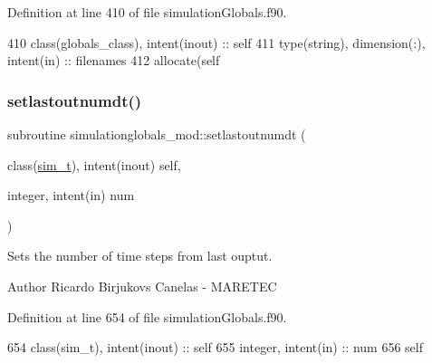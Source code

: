 Definition at line 410 of file simulation\+Globals.\+f90.


\begin{DoxyCode}
410     \textcolor{keywordtype}{class}(globals\_class), \textcolor{keywordtype}{intent(inout)} :: self
411     \textcolor{keywordtype}{type}(string), \textcolor{keywordtype}{dimension(:)}, \textcolor{keywordtype}{intent(in)} :: filenames
412     \textcolor{keyword}{allocate}(self%
\end{DoxyCode}
\mbox{\label{namespacesimulationglobals__mod_ab760ab6064743ff54237166301346616}} 
\subsubsection{\texorpdfstring{setlastoutnumdt()}{setlastoutnumdt()}}
{\footnotesize\ttfamily subroutine simulationglobals\+\_\+mod\+::setlastoutnumdt (\begin{DoxyParamCaption}\item[{class(\mbox{\hyperlink{structsimulationglobals__mod_1_1sim__t}{sim\+\_\+t}}), intent(inout)}]{self,  }\item[{integer, intent(in)}]{num }\end{DoxyParamCaption})\hspace{0.3cm}{\ttfamily [private]}}



Sets the number of time steps from last ouptut. 

\begin{DoxyAuthor}{Author}
Ricardo Birjukovs Canelas -\/ M\+A\+R\+E\+T\+EC 
\end{DoxyAuthor}


Definition at line 654 of file simulation\+Globals.\+f90.


\begin{DoxyCode}
654     \textcolor{keywordtype}{class}(sim\_t), \textcolor{keywordtype}{intent(inout)} :: self
655     \textcolor{keywordtype}{integer}, \textcolor{keywordtype}{intent(in)} :: num
656     self%
\end{DoxyCode}
\mbox{\label{namespacesimulationglobals__mod_affd52c4c7b1c3f7ce282eeb7e4b4a359}} 
